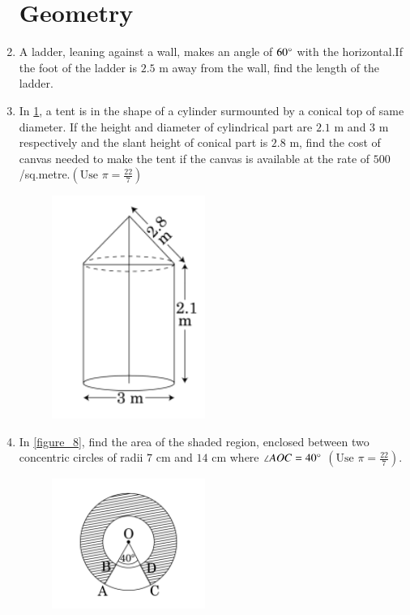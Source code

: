 \documentclass[12pt,-letter paper]{article}
\theoremstyle{remark}
\providecommand{\brak}[1]{\ensuremath{\left(#1\right)}}
\begin{document}
\begin{enumerate}
\section{Geometry}
\item A ladder, leaning against a wall, makes an angle of $60 \degree$ with the horizontal.If the foot of the ladder is $2.5$ m away from the wall, find the length of the ladder.\\
\item  In \ref{figure_7}, a tent is in the shape of a cylinder surmounted by a conical top of same diameter. If the height and diameter of cylindrical part are $2.1$ m and $3$ m respectively and the slant height of conical part is $2.8$ m, find the cost of canvas needed to make the tent if the canvas is available at the rate of \rupee $500$/sq.metre.$\brak{\text{Use } \pi = \frac{22}{7}}$\\
	\begin{figure}[H]
      \centering
      \includegraphics[width=5cm]{figs/5.png}
      \caption{}
      \label{figure_7}
\end{figure} 
\item  In \ref{figure_8}, find the area of the shaded region, enclosed between two concentric circles of radii $7$ cm and $14$ cm where $\angle AOC = 40\degree$ $\brak{\text{Use }\pi =\frac{22}{7}}$.
	\begin{figure}[H]
      \centering
      \includegraphics[width=5cm]{figs/6.png}

\end{figure}
\end{enumerate}
\end{document}
